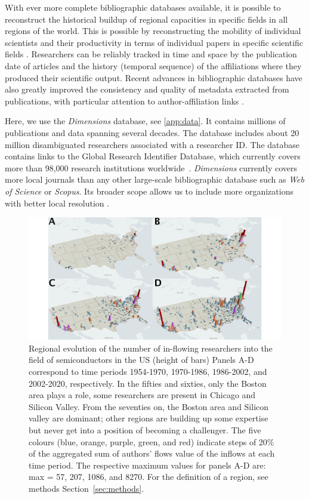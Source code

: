 \documentclass[draft,final]{vutinfth} %
\begin{document}
With ever more complete bibliographic databases available, it is possible to reconstruct the historical buildup of regional capacities in specific fields in all regions of the world. This is possible by reconstructing the mobility of individual scientists and their productivity in terms of individual papers in specific scientific fields \cite{machavcek2021researchers, sugimoto2017scientists}. Researchers can be reliably tracked in time and space by the publication date of articles and the history (temporal sequence) of the affiliations where they produced their scientific output. Recent advances in bibliographic databases have also greatly improved the consistency and quality of metadata extracted from publications, with particular attention to author-affiliation links \cite{sugimoto2017scientists, machavcek2021researchers}. 

Here, we use the {\em Dimensions} database, see \ref{app:data}. It contains millions of publications and data spanning several decades. The database includes about 20 million disambiguated researchers associated with a researcher ID. The database contains links to the Global Research Identifier Database, which currently covers more than 98,000 research institutions worldwide~\cite{hook2018dimensions, herzog2020dimensions}. {\em Dimensions} currently covers more local journals than any other large-scale bibliographic database such as {\em Web of Science} or {\em Scopus}. Its broader scope allows us to include more organizations with better local resolution \cite{hook2018dimensions}.

\begin{figure}[!ht]
\centering
\includegraphics[width=1.0\linewidth]{figures_csf/Figure1_maps.pdf}
\caption{Regional evolution of the number of in-flowing researchers into the field of semiconductors in the US (height of bars) Panels A-D correspond to time periods 1954-1970, 1970-1986, 1986-2002, and 2002-2020, respectively. In the fifties and sixties, only the Boston area plays a role, some researchers are present in Chicago and Silicon Valley. From the seventies on, the Boston area and Silicon valley are dominant; other regions are building up some expertise but never get into a position of becoming a challenger. The five colours (blue, orange, purple, green, and red) indicate steps of 20\% of the aggregated sum of authors' flows value of the inflows at each time period. The respective maximum values for panels A-D are: max = 57, 207, 1086, and 8270. For the definition of a region, see methods Section~\ref{sec:methods}. 
}
\label{Fig1}
\end{figure}
\end{document}
